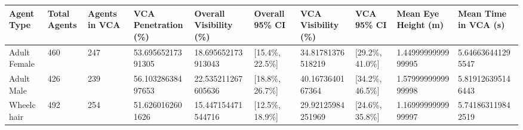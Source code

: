 \begin{tabular}{llllllllll}
\hline
Agent Type & Total Agents & Agents in VCA & VCA Penetration (\%) & Overall Visibility (\%) & Overall 95\% CI & VCA Visibility (\%) & VCA 95\% CI & Mean Eye Height (m) & Mean Time in VCA (s) \\ \hline
Adult Female & 460 & 247 & 53.69565217391305 & 18.695652173913043 & [15.4\%, 22.5\%] & 34.81781376518219 & [29.2\%, 41.0\%] & 1.4499999999999995 & 5.646636441295547 \\
Adult Male & 426 & 239 & 56.10328638497653 & 22.535211267605636 & [18.8\%, 26.7\%] & 40.1673640167364 & [34.2\%, 46.5\%] & 1.5799999999999998 & 5.819126395146443 \\
Wheelchair & 492 & 254 & 51.6260162601626 & 15.447154471544716 & [12.5\%, 18.9\%] & 29.92125984251969 & [24.6\%, 35.8\%] & 1.1699999999999997 & 5.741863119842519 \\
\hline
\end{tabular}
